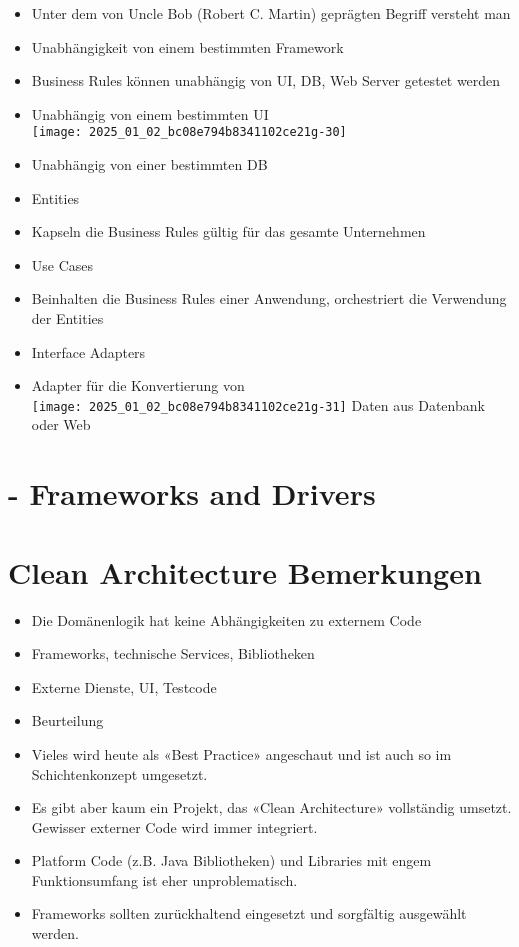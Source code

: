 \documentclass[10pt]{article}
\begin{document}
\begin{itemize}
  \item Unter dem von Uncle Bob (Robert C. Martin) geprägten Begriff versteht man
  \item Unabhängigkeit von einem bestimmten Framework
  \item Business Rules können unabhängig von UI, DB, Web Server getestet werden
  \item Unabhängig von einem bestimmten UI\\
\texttt{[image: 2025\_01\_02\_bc08e794b8341102ce21g-30]}
  \item Unabhängig von einer bestimmten DB
  \item Entities
  \item Kapseln die Business Rules gültig für das gesamte Unternehmen
  \item Use Cases
  \item Beinhalten die Business Rules einer Anwendung, orchestriert die Verwendung der Entities
  \item Interface Adapters
  \item Adapter für die Konvertierung von\\
\texttt{[image: 2025\_01\_02\_bc08e794b8341102ce21g-31]} Daten aus Datenbank oder Web
\end{itemize}

\section*{- Frameworks and Drivers}
\section*{Clean Architecture Bemerkungen}
\begin{itemize}
  \item Die Domänenlogik hat keine Abhängigkeiten zu externem Code
  \item Frameworks, technische Services, Bibliotheken
  \item Externe Dienste, UI, Testcode
  \item Beurteilung
  \item Vieles wird heute als «Best Practice» angeschaut und ist auch so im Schichtenkonzept umgesetzt.
  \item Es gibt aber kaum ein Projekt, das «Clean Architecture» vollständig umsetzt. Gewisser externer Code wird immer integriert.
  \item Platform Code (z.B. Java Bibliotheken) und Libraries mit engem Funktionsumfang ist eher unproblematisch.
  \item Frameworks sollten zurückhaltend eingesetzt und sorgfältig ausgewählt werden.
\end{itemize}
\end{document}
